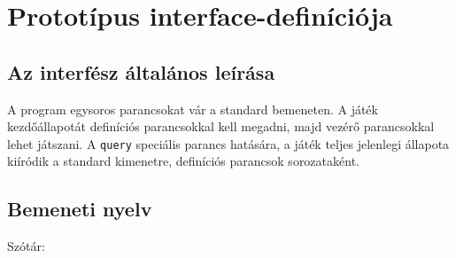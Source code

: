 \section{Prototípus interface-definíciója}

\subsection{Az interfész általános leírása}
A program egysoros parancsokat vár a standard bemeneten. A játék kezdőállapotát definíciós parancsokkal kell megadni, majd vezérő parancsokkal lehet játszani. A \texttt{query} speciális parancs hatására, a játék teljes jelenlegi állapota kiíródik a standard kimenetre, definíciós parancsok sorozataként.

\subsection{Bemeneti nyelv}



Szótár:

